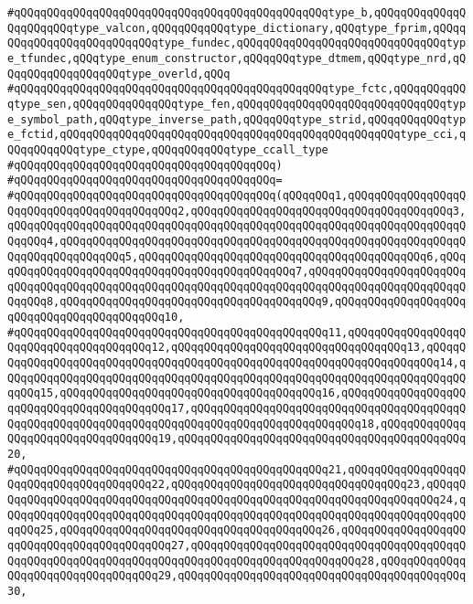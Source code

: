 \verb|#qQQqqQQqqQQqqQQqqQQqqQQqqQQqqQQqqQQqqQQqqQQqqQQqtype_b,qQQqqQQqqQQqqQQqqQQqqQQqtype_valcon,qQQqqQQqqQQqtype_dictionary,qQQqtype_fprim,qQQqqQQqqQQqqQQqqQQqqQQqqQQqtype_fundec,qQQqqQQqqQQqqQQqqQQqqQQqqQQqqQQqtype_tfundec,qQQqtype_enum_constructor,qQQqqQQqtype_dtmem,qQQqtype_nrd,qQQqqQQqqQQqqQQqqQQqtype_overld,qQQq|\newline
\verb|#qQQqqQQqqQQqqQQqqQQqqQQqqQQqqQQqqQQqqQQqqQQqqQQqtype_fctc,qQQqqQQqqQQqtype_sen,qQQqqQQqqQQqqQQqtype_fen,qQQqqQQqqQQqqQQqqQQqqQQqqQQqqQQqtype_symbol_path,qQQqtype_inverse_path,qQQqqQQqtype_strid,qQQqqQQqqQQqtype_fctid,qQQqqQQqqQQqqQQqqQQqqQQqqQQqqQQqqQQqqQQqqQQqqQQqqQQqtype_cci,qQQqqQQqqQQqtype_ctype,qQQqqQQqqQQqtype_ccall_type|\newline
\verb|#qQQqqQQqqQQqqQQqqQQqqQQqqQQqqQQqqQQqqQQq)|\newline
\verb|#qQQqqQQqqQQqqQQqqQQqqQQqqQQqqQQqqQQqqQQq=|\newline
\verb|#qQQqqQQqqQQqqQQqqQQqqQQqqQQqqQQqqQQqqQQq(qQQqqQQq1,qQQqqQQqqQQqqQQqqQQqqQQqqQQqqQQqqQQqqQQqqQQq2,qQQqqQQqqQQqqQQqqQQqqQQqqQQqqQQqqQQqqQQq3,qQQqqQQqqQQqqQQqqQQqqQQqqQQqqQQqqQQqqQQqqQQqqQQqqQQqqQQqqQQqqQQqqQQqqQQqqQQq4,qQQqqQQqqQQqqQQqqQQqqQQqqQQqqQQqqQQqqQQqqQQqqQQqqQQqqQQqqQQqqQQqqQQqqQQqqQQqqQQq5,qQQqqQQqqQQqqQQqqQQqqQQqqQQqqQQqqQQqqQQqqQQq6,qQQqqQQqqQQqqQQqqQQqqQQqqQQqqQQqqQQqqQQqqQQqqQQq7,qQQqqQQqqQQqqQQqqQQqqQQqqQQqqQQqqQQqqQQqqQQqqQQqqQQqqQQqqQQqqQQqqQQqqQQqqQQqqQQqqQQqqQQqqQQqqQQqqQQq8,qQQqqQQqqQQqqQQqqQQqqQQqqQQqqQQqqQQqqQQq9,qQQqqQQqqQQqqQQqqQQqqQQqqQQqqQQqqQQqqQQqqQQq10,|\newline
\verb|#qQQqqQQqqQQqqQQqqQQqqQQqqQQqqQQqqQQqqQQqqQQqqQQq11,qQQqqQQqqQQqqQQqqQQqqQQqqQQqqQQqqQQqqQQq12,qQQqqQQqqQQqqQQqqQQqqQQqqQQqqQQqqQQq13,qQQqqQQqqQQqqQQqqQQqqQQqqQQqqQQqqQQqqQQqqQQqqQQqqQQqqQQqqQQqqQQqqQQqqQQq14,qQQqqQQqqQQqqQQqqQQqqQQqqQQqqQQqqQQqqQQqqQQqqQQqqQQqqQQqqQQqqQQqqQQqqQQqqQQq15,qQQqqQQqqQQqqQQqqQQqqQQqqQQqqQQqqQQqqQQq16,qQQqqQQqqQQqqQQqqQQqqQQqqQQqqQQqqQQqqQQqqQQq17,qQQqqQQqqQQqqQQqqQQqqQQqqQQqqQQqqQQqqQQqqQQqqQQqqQQqqQQqqQQqqQQqqQQqqQQqqQQqqQQqqQQqqQQqqQQqqQQq18,qQQqqQQqqQQqqQQqqQQqqQQqqQQqqQQqqQQq19,qQQqqQQqqQQqqQQqqQQqqQQqqQQqqQQqqQQqqQQqqQQq20,|\newline
\verb|#qQQqqQQqqQQqqQQqqQQqqQQqqQQqqQQqqQQqqQQqqQQqqQQq21,qQQqqQQqqQQqqQQqqQQqqQQqqQQqqQQqqQQqqQQq22,qQQqqQQqqQQqqQQqqQQqqQQqqQQqqQQqqQQq23,qQQqqQQqqQQqqQQqqQQqqQQqqQQqqQQqqQQqqQQqqQQqqQQqqQQqqQQqqQQqqQQqqQQqqQQq24,qQQqqQQqqQQqqQQqqQQqqQQqqQQqqQQqqQQqqQQqqQQqqQQqqQQqqQQqqQQqqQQqqQQqqQQqqQQq25,qQQqqQQqqQQqqQQqqQQqqQQqqQQqqQQqqQQqqQQq26,qQQqqQQqqQQqqQQqqQQqqQQqqQQqqQQqqQQqqQQqqQQq27,qQQqqQQqqQQqqQQqqQQqqQQqqQQqqQQqqQQqqQQqqQQqqQQqqQQqqQQqqQQqqQQqqQQqqQQqqQQqqQQqqQQqqQQqqQQqqQQq28,qQQqqQQqqQQqqQQqqQQqqQQqqQQqqQQqqQQq29,qQQqqQQqqQQqqQQqqQQqqQQqqQQqqQQqqQQqqQQqqQQq30,|\newline
